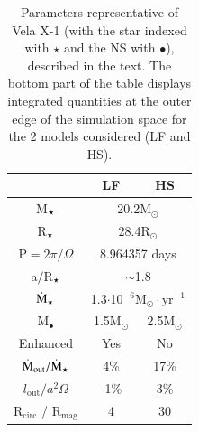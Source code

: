 \documentclass{aa}
\makeatletter
\newcommand*{\ns}{NS\@\xspace}
\newcommand{\mystar}{{\fontfamily{lmr}\selectfont$\star$}}
\makeatother
\begin{document}
\begin{center}
\begin{table}[!h]
\caption{Parameters representative of Vela X-1 (with the star indexed with \mystar\xspace and the \ns with $\bullet$), described in the text. The bottom part of the table displays integrated quantities at the outer edge of the simulation space for the 2 models considered (LF and HS).}
\label{tab:params}
\centering
\begin{tabularx}{0.53\columnwidth}{c|c|c}
   & LF & HS \\
  \hline
  M$_{\text{\mystar}}$ & \multicolumn{2}{c}{20.2M$_{\odot}$} \\
  R$_{\text{\mystar}}$ & \multicolumn{2}{c}{28.4R$_{\odot}$} \\
  P$=2\pi/\Omega$ & \multicolumn{2}{c}{8.964357 days} \\  
  a$/$R$_{\text{\mystar}}$ & \multicolumn{2}{c}{$\sim$1.8}\\
  $\dot{\text{M}}_{\text{\mystar}}$ & \multicolumn{2}{c}{1.3$\cdot$10$^{-6}$M$_{\odot}\cdot$yr$^{-1}$} \\
  \hline
  M$_{\bullet}$ & 1.5M$_{\odot}$  & 2.5M$_{\odot}$  \\
  Enhanced & Yes & No  \\
  \hline
  $\dot{\text{M}}_{\text{out}}/\dot{\text{M}}_{\text{\mystar}}$ & 4\% & 17\% \\
  $l_{\text{out}}/a^2\Omega$ & -1\% & 3\% \\
  R$_{\text{circ}}$ / R$_{\text{mag}}$ & 4 & 30 \\
\end{tabularx}
\end{table}
\end{center}
\end{document}
